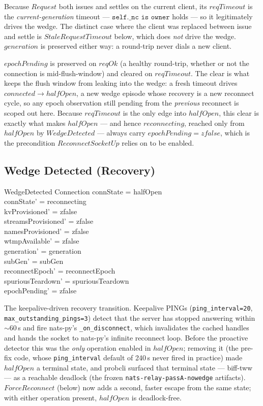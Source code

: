 \documentclass[a4paper,10pt,fleqn]{article}
\begin{document}
Because $Request$ both issues and settles on the current client,
its $reqTimeout$ is the \emph{current-generation} timeout ---
$\texttt{self.\_nc is owner}$ holds --- so it legitimately drives
the wedge.  The distinct case where the client was replaced
between issue and settle is $StaleRequestTimeout$ below, which does
\emph{not} drive the wedge.  $generation$ is preserved either way:
a round-trip never dials a new client.

$epochPending$ is preserved on $reqOk$ (a healthy round-trip, whether or
not the connection is mid-flush-window) and cleared on $reqTimeout$.  The
clear is what keeps the flush window from leaking into the wedge: a fresh
timeout drives $connected \to halfOpen$, a new wedge episode whose
recovery is a new reconnect cycle, so any epoch observation still pending
from the \emph{previous} reconnect is scoped out here.  Because
$reqTimeout$ is the only edge into $halfOpen$, this clear is exactly what
makes $halfOpen$ --- and hence $reconnecting$, reached only from
$halfOpen$ by $WedgeDetected$ --- always carry $epochPending = zfalse$,
which is the precondition $ReconnectSocketUp$ relies on to be enabled.

\subsection{Wedge Detected (Recovery)}

\begin{schema}{WedgeDetected}
  \Delta Connection
  \where
  connState = halfOpen \\
  connState' = reconnecting \\
  kvProvisioned' = zfalse \\
  streamsProvisioned' = zfalse \\
  namesProvisioned' = zfalse \\
  wtmpAvailable' = zfalse \\
  generation' = generation \\
  subGen' = subGen \\
  reconnectEpoch' = reconnectEpoch \\
  spuriousTeardown' = spuriousTeardown \\
  epochPending' = zfalse
\end{schema}

The keepalive-driven recovery transition.
Keepalive PINGs (\texttt{ping\_interval=20}, \texttt{max\_outstanding\_pings=3})
detect that the server has stopped answering within
$\sim$60\,s and fire nats-py's \texttt{\_on\_disconnect}, which
invalidates the cached handles and hands the socket to nats-py's
infinite reconnect loop.  Before the proactive detector this was
the \emph{only} operation enabled in $halfOpen$; removing it (the
pre-fix code, whose \texttt{ping\_interval} default of 240\,s never
fired in practice) made $halfOpen$ a terminal state, and probcli
surfaced that terminal state --- biff-tww --- as a reachable
deadlock (the frozen \texttt{nats-relay-passA-nowedge} artifacts).
$ForceReconnect$ (below) now adds a second, faster escape from the
same state; with either operation present, $halfOpen$ is
deadlock-free.
\end{document}
